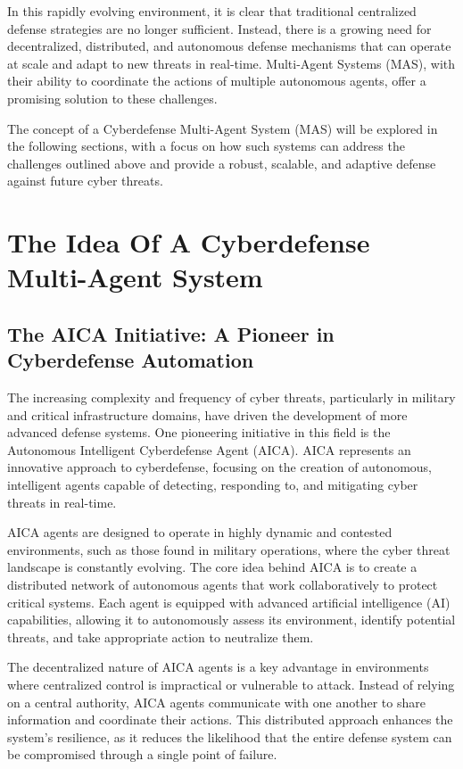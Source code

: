 In this rapidly evolving environment, it is clear that traditional centralized defense strategies are no longer sufficient. Instead, there is a growing need for decentralized, distributed, and autonomous defense mechanisms that can operate at scale and adapt to new threats in real-time. Multi-Agent Systems (MAS), with their ability to coordinate the actions of multiple autonomous agents, offer a promising solution to these challenges.

The concept of a Cyberdefense Multi-Agent System (MAS) will be explored in the following sections, with a focus on how such systems can address the challenges outlined above and provide a robust, scalable, and adaptive defense against future cyber threats.



\section{The Idea Of A Cyberdefense Multi-Agent System}

\subsection{The AICA Initiative: A Pioneer in Cyberdefense Automation}

The increasing complexity and frequency of cyber threats, particularly in military and critical infrastructure domains, have driven the development of more advanced defense systems. One pioneering initiative in this field is the Autonomous Intelligent Cyberdefense Agent (AICA). AICA represents an innovative approach to cyberdefense, focusing on the creation of autonomous, intelligent agents capable of detecting, responding to, and mitigating cyber threats in real-time.

AICA agents are designed to operate in highly dynamic and contested environments, such as those found in military operations, where the cyber threat landscape is constantly evolving. The core idea behind AICA is to create a distributed network of autonomous agents that work collaboratively to protect critical systems. Each agent is equipped with advanced artificial intelligence (AI) capabilities, allowing it to autonomously assess its environment, identify potential threats, and take appropriate action to neutralize them.

The decentralized nature of AICA agents is a key advantage in environments where centralized control is impractical or vulnerable to attack. Instead of relying on a central authority, AICA agents communicate with one another to share information and coordinate their actions. This distributed approach enhances the system's resilience, as it reduces the likelihood that the entire defense system can be compromised through a single point of failure.

